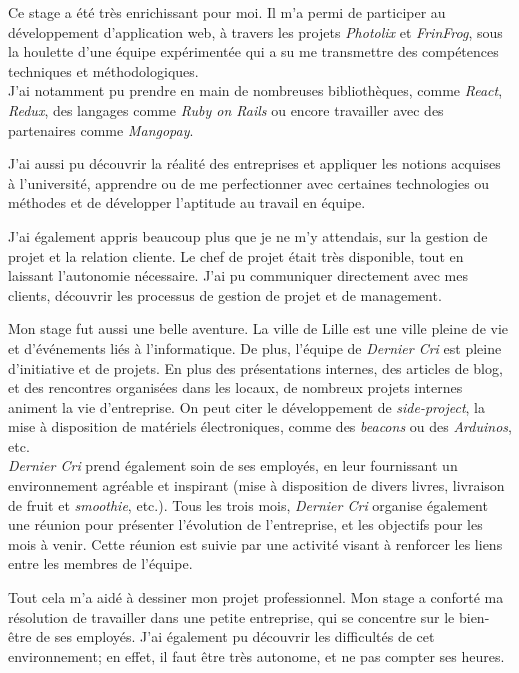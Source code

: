 \bigskip

Ce stage a été très enrichissant pour moi. Il m'a permi de participer au
développement d'application web, à travers les projets \emph{Photolix}
et \emph{FrinFrog}, sous la houlette d'une équipe expérimentée qui a su
me transmettre des compétences techniques et méthodologiques.\\
J'ai notamment pu prendre en main de nombreuses bibliothèques, comme
\emph{React}, \emph{Redux}, des langages comme \emph{Ruby on Rails} ou
encore travailler avec des partenaires comme \emph{Mangopay}.

\bigskip

J'ai aussi pu découvrir la réalité des entreprises et appliquer les
notions acquises à l'université, apprendre ou de me perfectionner avec
certaines technologies ou méthodes et de développer l'aptitude au
travail en équipe.

\bigskip

J'ai également appris beaucoup plus que je ne m'y attendais, sur la
gestion de projet et la relation cliente. Le chef de projet était très
disponible, tout en laissant l'autonomie nécessaire. J'ai pu communiquer
directement avec mes clients, découvrir les processus de gestion de
projet et de management.

\bigskip

Mon stage fut aussi une belle aventure. La ville de Lille est une ville
pleine de vie et d'événements liés à l'informatique. De plus, l'équipe
de \emph{Dernier Cri} est pleine d'initiative et de projets. En plus des
présentations internes, des articles de blog, et des rencontres
organisées dans les locaux, de nombreux projets internes animent la vie
d'entreprise. On peut citer le développement de \emph{side-project}, la
mise à disposition de matériels électroniques, comme des \emph{beacons}
ou des \emph{Arduinos}, etc.\\
\emph{Dernier Cri} prend également soin de ses employés, en leur
fournissant un environnement agréable et inspirant (mise à disposition
de divers livres, livraison de fruit et \emph{smoothie}, etc.). Tous les
trois mois, \emph{Dernier Cri} organise également une réunion pour
présenter l'évolution de l'entreprise, et les objectifs pour les mois à
venir. Cette réunion est suivie par une activité visant à renforcer les
liens entre les membres de l'équipe.

\bigskip

Tout cela m'a aidé à dessiner mon projet professionnel. Mon stage a
conforté ma résolution de travailler dans une petite entreprise, qui se
concentre sur le bien-être de ses employés. J'ai également pu découvrir
les difficultés de cet environnement; en effet, il faut être très
autonome, et ne pas compter ses heures.

